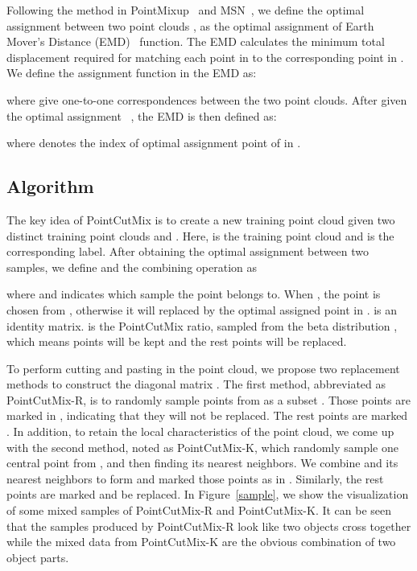 \documentclass{article}
\begin{document}
Following the method in PointMixup~\cite{pointmixup} and MSN~\cite{MSN}, we define the optimal assignment  between two point clouds ,  as the optimal assignment of Earth Mover's Distance (EMD)~\cite{emd} function.
The EMD calculates the minimum total displacement required for matching each point in  to the corresponding point in . We define the assignment function in the EMD as: 


where  give one-to-one correspondences between the two point clouds. After given the optimal assignment ~\cite{pointmixup}, the EMD is then defined as:

where  denotes the index of optimal assignment point of  in .


\subsection{Algorithm}
The key idea of PointCutMix is to create a new training point cloud  given two distinct training point clouds  and . Here,  is the training point cloud and  is the corresponding label. After obtaining the optimal assignment  between two samples, we define  and the combining operation as



where  and  indicates which sample the point belongs to. When , the  point is chosen from , otherwise it will replaced by the optimal assigned point in .
 is an identity matrix.  is the PointCutMix ratio, sampled from the beta distribution , which means  points will be kept and the rest points will be replaced.



To perform cutting and pasting in the point cloud, we propose two replacement methods to construct the diagonal matrix .
The first method, abbreviated as PointCutMix-R, is to randomly sample  points from  as a subset . Those points are marked  in , indicating that they will not be replaced. The rest points are marked .
In addition, to retain the local characteristics of the point cloud, we come up with the second method, noted as PointCutMix-K, which randomly sample one central point  from , and then finding its  nearest neighbors. We combine  and its nearest neighbors to form  and marked those points as  in . Similarly, the rest points are marked  and be replaced.
In Figure~\ref{sample}, we show the visualization of some mixed samples of PointCutMix-R and PointCutMix-K. It can be seen that the samples produced by PointCutMix-R look like two objects cross together while the mixed data from PointCutMix-K are the obvious combination of two object parts.
\end{document}
